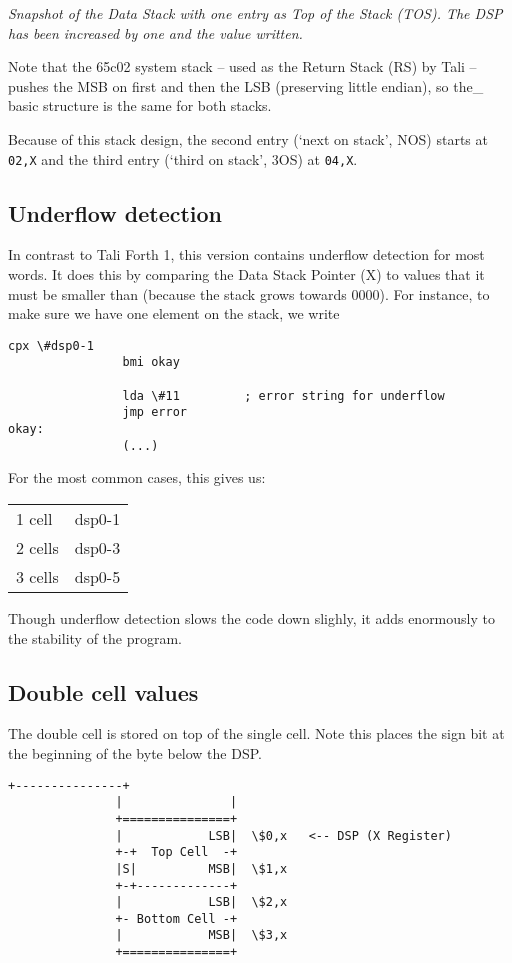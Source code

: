 \textit{Snapshot of the Data Stack with one entry as Top of the Stack (TOS). The
DSP has been increased by one and the value written.}

Note that the 65c02 system stack -- used as the Return Stack (RS) by Tali --
pushes the MSB on first and then the LSB (preserving little endian), so the_
basic structure is the same for both stacks. 

Because of this stack design, the second entry (`next on stack', NOS) starts at
\texttt{02,X} and the third entry (`third on stack', 3OS) at \texttt{04,X}. 

\subsection{Underflow detection} 
In contrast to Tali Forth 1, this version contains underflow detection for most
words. It does this by comparing the Data Stack Pointer (X) to values that it
must be smaller than (because the stack grows towards 0000). For instance, to
make sure we have one element on the stack, we write

\begin{lstlisting}[frame=single]
                cpx \#dsp0-1
                bmi okay

                lda \#11         ; error string for underflow
                jmp error
okay:
                (...)
\end{lstlisting}

For the most common cases, this gives us:

\begin{tabular}{ l c }
        1  cell   &  dsp0-1\\
        2  cells  &  dsp0-3\\
        3  cells  &  dsp0-5\\
\end{tabular}

Though underflow detection slows the code down slighly, it adds enormously to
the stability of the program.

\subsection{Double cell values}

The double cell is stored on top of the single cell.
Note this places the sign bit at the beginning of the byte below the DSP.

\begin{lstlisting}[frame=single]
               +---------------+
               |               |  
               +===============+  
               |            LSB|  \$0,x   <-- DSP (X Register) 
               +-+  Top Cell  -+         
               |S|          MSB|  \$1,x
               +-+-------------+ 
               |            LSB|  \$2,x
               +- Bottom Cell -+         
               |            MSB|  \$3,x   
               +===============+ 
\end{lstlisting}

